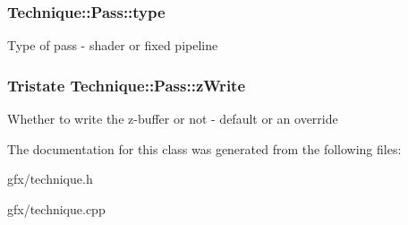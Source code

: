 \subsubsection[{\texorpdfstring{type}{type}}]{ Technique\+::\+Pass\+::type}\hypertarget{classTechnique_1_1Pass_af4d52a4bcd170b00657634510280e37e}{}\label{classTechnique_1_1Pass_af4d52a4bcd170b00657634510280e37e}
Type of pass -\/ shader or fixed pipeline 
\subsubsection[{\texorpdfstring{z\+Write}{zWrite}}]{\setlength{\rightskip}{0pt plus 5cm}Tristate Technique\+::\+Pass\+::z\+Write}\hypertarget{classTechnique_1_1Pass_a126c6263084feceff39fa066aee64413}{}\label{classTechnique_1_1Pass_a126c6263084feceff39fa066aee64413}
Whether to write the z-\/buffer or not -\/ default or an override 

The documentation for this class was generated from the following files\+:\begin{DoxyCompactItemize}
\item 
gfx/technique.\+h\item 
gfx/technique.\+cpp\end{DoxyCompactItemize}
